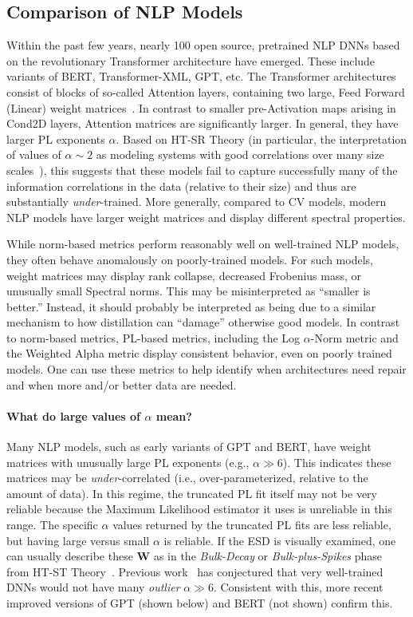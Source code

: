 \subsection{Comparison of NLP Models}
\label{sxn:nlp}

Within the past few years, nearly 100 open source, pretrained NLP DNNs based on the revolutionary Transformer architecture have emerged.
These include variants of BERT, Transformer-XML, GPT, etc.
The Transformer architectures consist of blocks of so-called Attention layers, containing two large, Feed Forward (Linear) weight matrices~\cite{Attn2017}. 
In contrast to smaller pre-Activation maps arising in Cond2D layers, Attention matrices are significantly larger.
In general, they have larger PL exponents $\alpha$.
Based on HT-SR Theory
(in particular, the interpretation of values of $\alpha \sim 2$ as modeling systems with good correlations over many size scales~\cite{BouchaudPotters03, SornetteBook}), 
this suggests that these models fail to capture successfully many of the information correlations in the data (relative to their size) and thus are substantially \emph{under}-trained.
More generally, compared to CV models,
modern NLP models have larger weight matrices and display different spectral properties.

While norm-based metrics perform reasonably well on well-trained NLP models, they often behave anomalously on poorly-trained models.
For such models, weight matrices may display rank collapse, decreased Frobenius mass, or unusually small Spectral norms.
This may be misinterpreted as ``smaller is better.'' 
Instead, it should probably be interpreted as being due to a similar mechanism to how distillation can ``damage'' otherwise good models.
In contrast to norm-based metrics, PL-based metrics, including the Log $\alpha$-Norm metric and the Weighted Alpha metric display consistent behavior, even on poorly trained models.
One can use these metrics to help identify when architectures need repair and when more and/or better data are needed.


\paragraph{What do large values of $\alpha$ mean?}

Many NLP models, such as early variants of GPT and BERT, have weight matrices with unusually large PL exponents (e.g., $\alpha\gg 6$).
This indicates these matrices may be \emph{under}-correlated (i.e., over-parameterized, relative to the amount of data).
In this regime, the truncated PL fit itself may not be very reliable because the Maximum Likelihood estimator it uses is unreliable in this range.
The specific $\alpha$ values returned by the truncated PL fits are less reliable, but having large versus small $\alpha$ is reliable.
If the ESD is visually examined, one can usually describe these $\mathbf{W}$ as in the \emph{Bulk-Decay} or \emph{Bulk-plus-Spikes} phase from HT-ST Theory~\cite{MM18_TR,MM19_HTSR_ICML}.
Previous work~\cite{MM18_TR,MM19_HTSR_ICML} has conjectured that very well-trained DNNs would not have many \emph{outlier} $\alpha\gg 6$.
Consistent with this, more recent improved versions of GPT (shown below) and BERT (not shown) confirm this.


